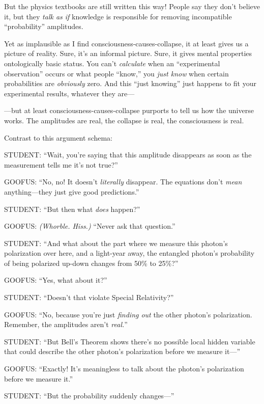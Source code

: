 {
 But the physics textbooks are still written this way! People say
they don't believe it, but they \textit{talk as if}
knowledge is responsible for removing incompatible
``probability'' amplitudes.}

{
 Yet as implausible as I find consciousness-causes-collapse, it at
least gives us a picture of reality. Sure, it's an
informal picture. Sure, it gives mental properties ontologically basic
status. You can't \textit{calculate} when an
``experimental observation'' occurs
or what people ``know,'' you
\textit{just know} when certain probabilities are \textit{obviously}
zero. And this ``just knowing'' just
happens to fit your experimental results, whatever they are---}

{
 {}---but at least consciousness-causes-collapse purports to tell
us how the universe works. The amplitudes are real, the collapse is
real, the consciousness is real.}

{
 Contrast to this argument schema:}

{
 STUDENT: ``Wait, you're saying
that this amplitude disappears as soon as the measurement tells me
it's not true?''}

{
 GOOFUS: ``No, no! It doesn't
\textit{literally} disappear. The equations don't
\textit{mean} anything---they just give good
predictions.''}

{
 STUDENT: ``But then what \textit{does}
happen?''}

{
 GOOFUS: \textit{(Whorble. Hiss.)} ``Never ask
that question.''}

{
 STUDENT: ``And what about the part where we
measure this photon's polarization over here, and a
light-year away, the entangled photon's probability of
being polarized up-down changes from 50\% to 25\%?''}

{
 GOOFUS: ``Yes, what about
it?''}

{
 STUDENT: ``Doesn't that violate
Special Relativity?''}

{
 GOOFUS: ``No, because you're just
\textit{finding out} the other photon's polarization.
Remember, the amplitudes aren't
\textit{real.}''}

{
 STUDENT: ``But Bell's Theorem
shows there's no possible local hidden variable that
could describe the other photon's polarization before
we measure it---''}

{
 GOOFUS: ``Exactly! It's
meaningless to talk about the photon's polarization
before we measure it.''}

{
 STUDENT: ``But the probability suddenly
changes---''}

